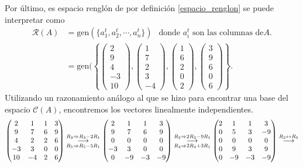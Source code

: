 \documentclass[11pt,letterpaper]{article}
\newcommand{\mcC}{\mathcal{C}}
\newcommand{\mcR}{\mathcal{R}}
\newcommand{\grstep}[2][\relax]{%
   \ensuremath{\mathrel{
       {\mathop{\longrightarrow}\limits^{#2\mathstrut}_{
                                     \begin{subarray}{l} #1 \end{subarray}}}}}}
\newcommand{\gen}{\text{gen}}
\begin{document}
\begin{enumerate}
Por último, es espacio renglón de por definición \ref{espacio_renglon} se puede interpretar como
\begin{align*}
\mcR(A)&=\gen(\{a_1^t, a_2^t,\cdots,a_n^t\}) \ \ \text{ donde } a_i^t \text{ son las columnas de} A.\\
&=\gen(\left\{\begin{pmatrix}2\\9\\4\\-3\\10\end{pmatrix}, 
\begin{pmatrix}1\\7\\2\\3\\-4\end{pmatrix},
\begin{pmatrix}1\\6\\2\\0\\2\end{pmatrix},
\begin{pmatrix}3\\9\\6\\0\\6\end{pmatrix}
\right\}.
\end{align*}
Utilizando un razonamiento análogo al que se hizo para encontrar una base del espacio $\mcC(A)$, encontremos los vectores linealmente independientes.
\begin{align*}
\begin{pmatrix}
 2&1 &1&3\\
 9&7 &6&9\\
 4&2 &2&6\\
-3&3 &0&0\\
10&-4&2&6\\
\end{pmatrix}%
\grstep[R_5\Rightarrow R_5-5R_1]{R_3 \Rightarrow R_3-2R_1}
%
\begin{pmatrix}
 2&1 &1&3\\
 9&7 &6&9\\
 0&0 &0&0\\
-3&3 &0&0\\
0&-9&-3&-9\\
\end{pmatrix}%
\grstep[R_4\Rightarrow 2R_4+3R_1]{R_2 \Rightarrow 2R_2-9R_1}
%
\begin{pmatrix}
 2&1 &1&3\\
 0&5 &3&-9\\
 0&0 &0&0\\
 0&9 &3&9\\
0&-9&-3&-9\\
\end{pmatrix}%
\grstep[]{R_2\leftrightarrow R_5}
\end{align*}


\end{enumerate}
\end{document}
